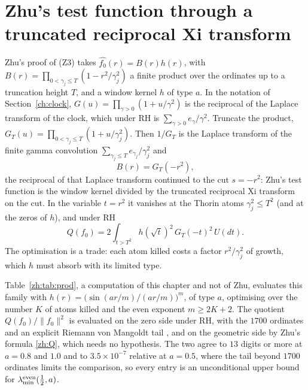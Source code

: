 \section{Zhu's test function through a truncated reciprocal Xi transform}\label{zh:sec:extremal}

Zhu's proof of (Z3) takes $\widehat{f_0}(r)=B(r)h(r)$, with $B(r)=\prod_{0<\gamma_j\le T}(1-r^2/\gamma_j^2)$ a finite product over the ordinates up to a truncation height $T$, and a window kernel $h$ of type $a$. In the notation of Section~\ref{ch:clock}, $G(u)=\prod_{\gamma>0}(1+u/\gamma^2)$ is the reciprocal of the Laplace transform of the clock, which under RH is $\sum_{\gamma>0}e_\gamma/\gamma^2$. Truncate the product, $G_T(u)=\prod_{0<\gamma_j\le T}(1+u/\gamma_j^2)$. Then $1/G_T$ is the Laplace transform of the finite gamma convolution $\sum_{\gamma_j\le T}e_{\gamma_j}/\gamma_j^2$ and
\[
B(r)=G_T(-r^2),
\]
the reciprocal of that Laplace transform continued to the cut $s=-r^2$: Zhu's test function is the window kernel divided by the truncated reciprocal Xi transform on the cut. In the variable $t=r^2$ it vanishes at the Thorin atoms $\gamma_j^2\le T^2$ (and at the zeros of $h$), and under RH
\[
Q(f_0)=2\int_{t>T^2}h(\sqrt t)^2\,G_T(-t)^2\,U(dt).
\]
The optimisation is a trade: each atom killed costs a factor $r^2/\gamma_j^2$ of growth, which $h$ must absorb with its limited type.

Table~\ref{zh:tab:prod}, a computation of this chapter and not of Zhu, evaluates this family with $h(r)=\bigl(\sin(ar/m)/(ar/m)\bigr)^m$, of type $a$, optimising over the number $K$ of atoms killed and the even exponent $m\ge2K+2$. The quotient $Q(f_0)/\|f_0\|^2$ is evaluated on the zero side under RH, with the $1700$ ordinates and an explicit Riemann von Mangoldt tail \cite{HSW22}, and on the geometric side by Zhu's formula \eqref{zh:Q}, which needs no hypothesis. The two agree to $13$ digits or more at $a=0.8$ and $1.0$ and to $3.5\times10^{-7}$ relative at $a=0.5$, where the tail beyond $1700$ ordinates limits the comparison, so every entry is an unconditional upper bound for $\lambda^{\rm even}_{\min}(\frac12,a)$.

\begin{table}[t]
\centering
{}
\caption{The best Rayleigh quotient $Q(f_0)/\|f_0\|^2$ of Zhu's product family over the number $K$ of atoms killed and the even exponent $m$, with the optimal $K$ and $m$, the last ordinate $\gamma_K$ killed, the number $N(T_*)$ of ordinates below the resolution height $T_*=2\pi e^{2a}$ of Section~\ref{zh:sec:horizon}, and $T_*$ itself.}
\label{zh:tab:prod}
\end{table}

